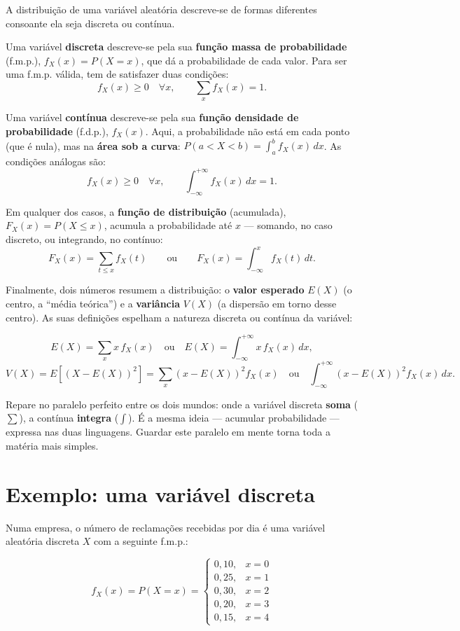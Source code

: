 \documentclass[
  portuguese,
  11pt,
  openany]{book}
\begin{document}
A distribuição de uma variável aleatória descreve-se de formas diferentes consoante ela
seja discreta ou contínua.

Uma variável \textbf{discreta} descreve-se pela sua \textbf{função massa de probabilidade}
(f.m.p.), \(f_X(x) = P(X = x)\), que dá a probabilidade de cada valor. Para ser uma
f.m.p. válida, tem de satisfazer duas condições:
\[f_X(x) \geq 0 \quad \forall x, \qquad \sum_{x} f_X(x) = 1.\]

Uma variável \textbf{contínua} descreve-se pela sua \textbf{função densidade de probabilidade}
(f.d.p.), \(f_X(x)\). Aqui, a probabilidade não está em cada ponto (que é nula), mas na
\textbf{área sob a curva}: \(P(a < X < b) = \int_a^b f_X(x)\,dx\). As condições análogas são:
\[f_X(x) \geq 0 \quad \forall x, \qquad \int_{-\infty}^{+\infty} f_X(x)\,dx = 1.\]

Em qualquer dos casos, a \textbf{função de distribuição} (acumulada), \(F_X(x) = P(X \leq x)\),
acumula a probabilidade até \(x\) --- somando, no caso discreto, ou integrando, no contínuo:
\[F_X(x) = \sum_{t \leq x} f_X(t) \qquad \text{ou} \qquad F_X(x) = \int_{-\infty}^{x} f_X(t)\,dt.\]

Finalmente, dois números resumem a distribuição: o \textbf{valor esperado} \(E(X)\) (o centro,
a ``média teórica'') e a \textbf{variância} \(V(X)\) (a dispersão em torno desse centro). As suas
definições espelham a natureza discreta ou contínua da variável:

\[E(X) = \sum_x x\, f_X(x) \quad \text{ou} \quad E(X) = \int_{-\infty}^{+\infty} x\, f_X(x)\,dx,\]
\[V(X) = E\!\left[(X - E(X))^2\right] = \sum_x (x - E(X))^2 f_X(x) \quad \text{ou} \quad \int_{-\infty}^{+\infty} (x - E(X))^2 f_X(x)\,dx.\]

Repare no paralelo perfeito entre os dois mundos: onde a variável discreta \textbf{soma}
(\(\sum\)), a contínua \textbf{integra} (\(\int\)). É a mesma ideia --- acumular probabilidade ---
expressa nas duas linguagens. Guardar este paralelo em mente torna toda a matéria mais
simples.

\section{Exemplo: uma variável discreta}\label{exemplo-uma-variuxe1vel-discreta}

Numa empresa, o número de reclamações recebidas por dia é uma variável aleatória
discreta \(X\) com a seguinte f.m.p.:

\[f_X(x) = P(X = x) =
\begin{cases}
0{,}10, & x = 0 \\
0{,}25, & x = 1 \\
0{,}30, & x = 2 \\
0{,}20, & x = 3 \\
0{,}15, & x = 4
\end{cases}\]
\end{document}
